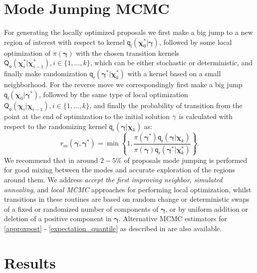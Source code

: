 \documentclass[a0,portrait]{a0poster}
\begin{document}
\begin{multicols}{2}
\section*{Mode Jumping MCMC}
For generating the locally optimized proposals we first make a big jump to a new region of interest with respect to kernel $\mathsf{q}_\mathsf{l}(\boldsymbol{\chi}^{*}_0|\boldsymbol{\gamma})$, followed by some local optimization of $\pi{(\boldsymbol{\gamma})}$ with the chosen transition kernels $\mathsf{Q}_\mathsf{o}(\boldsymbol{\chi}^*_{i}|\boldsymbol{\chi}^*_{i-1}), i \in \{1,...,k\}$, which can be either stochastic or deterministic, and finally make randomization $\mathsf{q}_\mathsf{r}(\boldsymbol{\gamma}^*|\boldsymbol{\chi}^*_{k})$ with a kernel based on a small neighborhood. For the reverse move we correspondingly first make a big jump $\mathsf{q}_\mathsf{l}(\boldsymbol{\chi}_0|\boldsymbol{\gamma}^*)$, followed by the same type of local optimization $\mathsf{Q}_\mathsf{o}(\boldsymbol{\chi}_{i}|\boldsymbol{\chi}_{i-1}), i \in \{1,...,k\}$, and finally the probability of transition from the point at the end of optimization to the initial solution $\bold{\gamma}$ is calculated with respect to the randomizing kernel $\mathsf{q}_\mathsf{r}(\boldsymbol{\gamma}|\boldsymbol{\chi}_{k})$ as:
\begin{equation}
r_m(\boldsymbol{\gamma},\boldsymbol{\gamma}^*) = \min\left\{1,\frac{\pi(\boldsymbol{\gamma}^*)\mathsf{q}_\mathsf{r}(\boldsymbol{\gamma}|\boldsymbol{\chi}_{k})}{\pi(\boldsymbol{\gamma})\mathsf{q}_\mathsf{r}(\boldsymbol{\gamma}^*|\boldsymbol{\chi}^*_{k})}\right\}\label{locmcmcgen}.
\end{equation}
We recommend that in around $2-5\%$ of proposals mode jumping is performed for good mixing between the modes and accurate exploration of the regions around them. We address \textit{accept the first improving neighbor}, \textit{simulated annealing}, and \textit{local MCMC} approaches for performing local optimization, whilst transitions in these routines are based on random change or deterministic swaps of a fixed or randomized number of components of $\boldsymbol{\gamma}$, or by uniform addition or deletion of a positive component in $\boldsymbol{\gamma}$. Alternative MCMC estimators for \eqref{approxpost} - \eqref{expectation_quantile} as described in \cite{Clyde:Ghosh:Littman:2010, Hubin2016} are also available.

\section*{Results}


\end{multicols}
\end{document}

